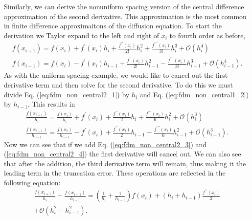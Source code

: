 \par
Similarly, we can derive the nonuniform spacing version of the central difference approximation of the second derivative.
This approximation is the most common in finite difference approximaitons of the diffusion equation.  To start the 
derivation we Taylor expand to the left and right of $x_{i}$ to fourth order as before,
\begin{eqnarray}
    f\left(x_{i+1}\right) = f\left(x_{i}\right) + f^{\prime}\left(x_{i}\right)h_{i} + \frac{f^{\prime\prime}\left(x_{i}\right)}  
   {2!}h^{2} _{i}+ \frac{f^{\prime\prime\prime}\left(x_{i}\right)}{3!}h^{3}_{i} + \mathcal{O}\left(h^{4}_{i}\right) \\
  \label{eq:fdm_non_central2_1}
    f\left(x_{i-1}\right) = f\left(x_{i}\right) - f^{\prime}\left(x_{i}\right)h_{i-1} + \frac{f^{\prime\prime}\left(x_{i}\right)}
   {2!}h^{2}_{i-1} - \frac{f^{\prime\prime\prime}\left(x_{i}\right)}{3!}h^{3}_{i-1} + \mathcal{O}\left(h^{4}_{i-1}\right).
  \label{eq:fdm_non_central2_2}
\end{eqnarray}
As with the uniform spacing example, we would like to cancel out the first derivative term and then solve for the second
derivative. To do this we must divide Eq. (\ref{eq:fdm_non_central2_1}) by $h_{i}$ and Eq. (\ref{eq:fdm_non_central1_2})
by $h_{i-1}$. This results in
\begin{eqnarray}
    \frac{f\left(x_{i+1}\right)}{h_{i}} = \frac{f\left(x_{i}\right)}{h_{i}} + f^{\prime}\left(x_{i}\right) + 
    \frac{f^{\prime\prime}\left(x_{i}\right)}{2}h _{i}+ \frac{f^{\prime\prime\prime}\left(x_{i}\right)}{6}h^{2}_{i} +   
    \mathcal{O}\left(h^{3}_{i}\right) \\
  \label{eq:fdm_non_central2_3}
    \frac{f\left(x_{i-1}\right)}{h_{i-1}} = \frac{f\left(x_{i}\right)}{h_{i-1}} - f^{\prime}\left(x_{i}\right) + 
    \frac{f^{\prime\prime}\left(x_{i}\right)}{2}h_{i-1} - \frac{f^{\prime\prime\prime}\left(x_{i}\right)}{6}h^{2}_{i-1} + 
    \mathcal{O}\left(h^{3}_{i-1}\right).
  \label{eq:fdm_non_central2_4}
\end{eqnarray}
Now we can see that if we add Eq. (\ref{eq:fdm_non_central2_3}) and (\ref{eq:fdm_non_central2_4}) the first derivative
will cancel out.  We can also see that after the addition, the third derivative term will remain, thus making it the leading term
in the truncation error. These operations are reflected in the following equation:
\begin{eqnarray}
     \frac{f\left(x_{i+1}\right)}{h_{i}} + \frac{f\left(x_{i-1}\right)}{h_{i-1}} = \left(\frac{1}{h_{i}} + \frac{1}{h_{i-1}}\right)
     f\left(x_{i}\right) + \left(h_{i} + h_{i-1}\right)\frac{f^{\prime\prime}\left(x_{i}\right)}{2}  \\
     + \mathcal{O}\left(h^{2}_{i} - h^{2}_{i-1}\right). \nonumber
\end{eqnarray}
